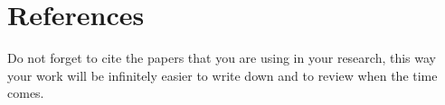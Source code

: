 \documentclass{project-logbook}
\begin{document}





\appendix

\section{References}
	\begin{HighlightedNote}{}
		Do not forget to cite the papers that you are using in your research, this way your work will be infinitely easier to write down and to review when the time comes.
	\end{HighlightedNote}

	\printbibliography[heading=none]
\end{document}
